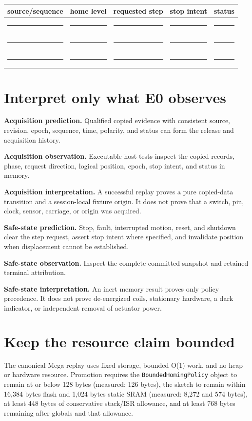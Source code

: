 \documentclass[10pt]{article}
\newcommand{\blankline}{\rule{0.72in}{0.4pt}}
\begin{document}
\begin{tabularx}{\linewidth}{@{}X X X X X@{}}
\toprule
source/sequence & home level & requested step & stop intent & status\\
\midrule
\rule{0pt}{16pt}\blankline & \blankline & \blankline & \blankline & \blankline\\[9pt]
\blankline & \blankline & \blankline & \blankline & \blankline\\[9pt]
\blankline & \blankline & \blankline & \blankline & \blankline\\
\bottomrule
\end{tabularx}

\section{Interpret only what E0 observes}
\textbf{Acquisition prediction.} Qualified copied evidence with consistent
source, revision, epoch, sequence, time, polarity, and status can form the
release and acquisition history.

\textbf{Acquisition observation.} Executable host tests inspect the copied
records, phase, request direction, logical position, epoch, stop intent, and
status in memory.

\textbf{Acquisition interpretation.} A successful replay proves a pure
copied-data transition and a session-local fixture origin. It does not prove
that a switch, pin, clock, sensor, carriage, or origin was acquired.

\textbf{Safe-state prediction.} Stop, fault, interrupted motion, reset, and
shutdown clear the step request, assert stop intent where specified, and
invalidate position when displacement cannot be established.

\textbf{Safe-state observation.} Inspect the complete committed snapshot and
retained terminal attribution.

\textbf{Safe-state interpretation.} An inert memory result proves only policy
precedence. It does not prove de-energized coils, stationary hardware, a dark
indicator, or independent removal of actuator power.

\section{Keep the resource claim bounded}
The canonical Mega replay uses fixed storage, bounded O(1) work, and no heap
or hardware resource. Promotion requires the \texttt{BoundedHomingPolicy}
object to remain at or below 128 bytes (measured: 126 bytes), the sketch to
remain within 16,384 bytes flash and 1,024 bytes static SRAM (measured: 8,272
and 574 bytes), at least 448 bytes of conservative stack/ISR allowance, and at
least 768 bytes remaining after globals and that allowance.
\end{document}
